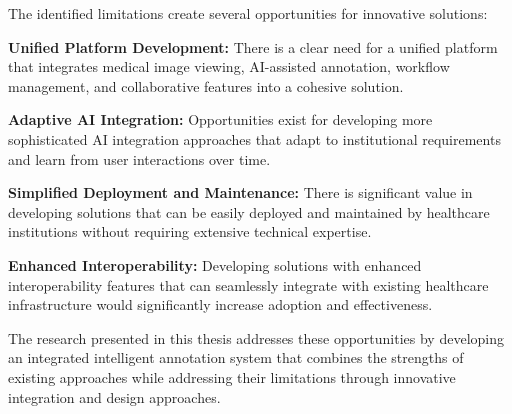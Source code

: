 The identified limitations create several opportunities for innovative solutions:

\textbf{Unified Platform Development:} There is a clear need for a unified platform that integrates medical image viewing, AI-assisted annotation, workflow management, and collaborative features into a cohesive solution.

\textbf{Adaptive AI Integration:} Opportunities exist for developing more sophisticated AI integration approaches that adapt to institutional requirements and learn from user interactions over time.

\textbf{Simplified Deployment and Maintenance:} There is significant value in developing solutions that can be easily deployed and maintained by healthcare institutions without requiring extensive technical expertise.

\textbf{Enhanced Interoperability:} Developing solutions with enhanced interoperability features that can seamlessly integrate with existing healthcare infrastructure would significantly increase adoption and effectiveness.

The research presented in this thesis addresses these opportunities by developing an integrated intelligent annotation system that combines the strengths of existing approaches while addressing their limitations through innovative integration and design approaches. 